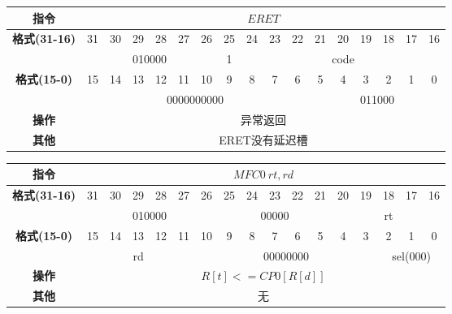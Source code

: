 \documentclass[11pt,utf8]{article}
\begin{document}
\begin{center}
\begin{tabular}{|c|c|c|c|c|c|c|c|c|c|c|c|c|c|c|c|c|}
\hline
\textbf{指令} & \multicolumn{16}{c|}{$ERET$} \\
\hline
\multirow{2}{*}{\textbf{格式(31-16)}} & 31 & 30 & 29 & 28 & 27 & 26 & 25 & 24 & 23 & 22 & 21 & 20 & 19 & 18 & 17 & 16 \\ 
\cline{2-17}
& \multicolumn{6}{c|}{010000} & 1 & \multicolumn{9}{c|}{code} \\
\hline
\multirow{2}{*}{\textbf{格式(15-0)}} & 15 & 14 & 13 & 12 & 11 & 10 & 9 & 8 & 7 & 6 & 5 & 4 & 3 & 2 & 1 & 0 \\
\cline{2-17}
& \multicolumn{10}{c|}{0000000000}& \multicolumn{6}{c|}{011000}\\
\hline
\textbf{操作} & \multicolumn{16}{c|}{异常返回} \\
\hline
\textbf{其他} & \multicolumn{16}{c|}{ERET没有延迟槽} \\
\hline
\end{tabular}
\end{center}

\begin{center}
\begin{tabular}{|c|c|c|c|c|c|c|c|c|c|c|c|c|c|c|c|c|}
\hline
\textbf{指令} & \multicolumn{16}{c|}{$MFC0~rt,rd$} \\
\hline
\multirow{2}{*}{\textbf{格式(31-16)}} & 31 & 30 & 29 & 28 & 27 & 26 & 25 & 24 & 23 & 22 & 21 & 20 & 19 & 18 & 17 & 16 \\ 
\cline{2-17}
& \multicolumn{6}{c|}{010000} & \multicolumn{5}{c|}{00000} & \multicolumn{5}{c|}{rt} \\
\hline
\multirow{2}{*}{\textbf{格式(15-0)}} & 15 & 14 & 13 & 12 & 11 & 10 & 9 & 8 & 7 & 6 & 5 & 4 & 3 & 2 & 1 & 0 \\
\cline{2-17}
& \multicolumn{5}{c|}{rd}& \multicolumn{8}{c|}{00000000}& \multicolumn{3}{c|}{sel(000)}\\
\hline
\textbf{操作} & \multicolumn{16}{c|}{$R[t]<=CP0[R[d]]$} \\
\hline
\textbf{其他} & \multicolumn{16}{c|}{无} \\
\hline
\end{tabular}
\end{center}
\end{document}
